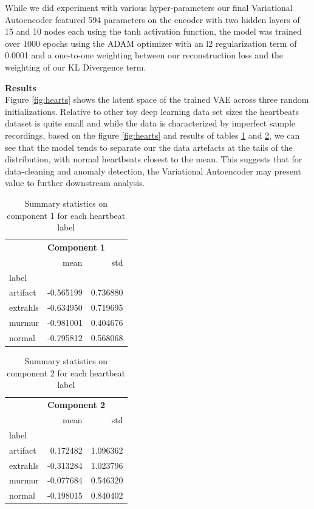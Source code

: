 \documentclass[12pt]{article}
\begin{document}
While we did experiment with various hyper-parameters our final Variational Autoencoder featured 594 parameters on the encoder with two hidden layers of 15 and 10 nodes each using the tanh activation function, the model was trained over 1000 epochs using the ADAM optimizer with an l2 regularization term of 0.0001 and a one-to-one weighting between our reconstruction loss and the weighting of our KL Divergence term.   

\textbf{Results} \\
Figure \ref{fig:hearts} shows the latent space of the trained VAE across three random initializations. Relative to other toy deep learning data set sizes the heartbeats dataset is quite small and while the data is characterized by imperfect sample recordings, based on the figure \ref{fig:hearts} and results of tables \ref{table:heartbeatcomponent1} and \ref{table:heartbeatcomponent2}, we can see that the model tends to separate our the data artefacts at the tails of the distribution, with normal heartbeats closest to the mean.  This suggests that for data-cleaning and anomaly detection, the Variational Autoencoder may present value to further downstream analysis.   



\begin{table}[h!]
\centering
\begin{tabular}{lrr}
{} & \multicolumn{2}{l}{\textbf{Component 1}} \\
{} &        mean &       std \\
label    &             &           \\
artifact &   -0.565199 &  0.736880 \\
extrahls &   -0.634950 &  0.719695 \\
murmur   &   -0.981001 &  0.404676 \\
normal   &   -0.795812 &  0.568068 \\
\end{tabular}
\caption{Summary statistics on component 1 for each heartbeat label}
\label{table:heartbeatcomponent1}
\end{table}

\begin{table}[h!]
\centering
\begin{tabular}{lrr}
{} & \multicolumn{2}{l}{\textbf{Component 2}} \\
{} &        mean &       std \\
label    &             &           \\
artifact &    0.172482 &  1.096362 \\
extrahls &   -0.313284 &  1.023796 \\
murmur   &   -0.077684 &  0.546320 \\
normal   &   -0.198015 &  0.840402 \\
\end{tabular}
\caption{Summary statistics on component 2 for each heartbeat label}
\label{table:heartbeatcomponent2}
\end{table}
\end{document}
